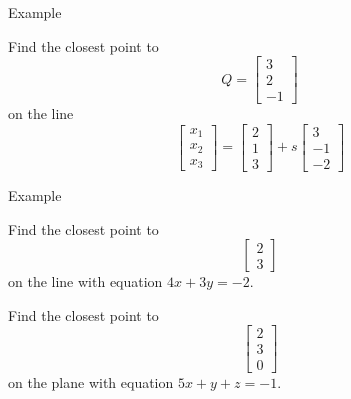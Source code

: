 \documentclass{beamer}
\begin{document}
\begin{frame}{Example}
    \begin{example}
    Find the closest point to
    \begin{equation*}
      Q=\left[
	\begin{array}{c}
          3\\
          2\\
          -1
	\end{array}
      \right]
    \end{equation*}
    on the line
    \begin{equation*}
      \left[
	\begin{array}{c}
          x_1\\
          x_2\\
          x_3
	\end{array}
      \right] = \left[
	\begin{array}{c}
          2\\
          1\\
          3
	\end{array}
      \right]+s \left[
	\begin{array}{c}
          3\\
          -1\\
          -2
	\end{array}
      \right]
    \end{equation*}
  \end{example}
\end{frame}

\begin{frame}{Example}
    \begin{example}
        Find the closest point to
        \begin{equation*}
          \left[
        \begin{array}{c}
              2\\
              3
        \end{array}
          \right]
        \end{equation*}
        on the line with equation $4x+3y = -2$.
      \end{example}
    \begin{example}
    Find the closest point to
    \begin{equation*}
      \left[
	\begin{array}{c}
          2\\
          3\\
          0
	\end{array}
      \right]
    \end{equation*}
    on the plane with equation $5x+y+z = -1$.
  \end{example}
\end{frame}
\end{document}
